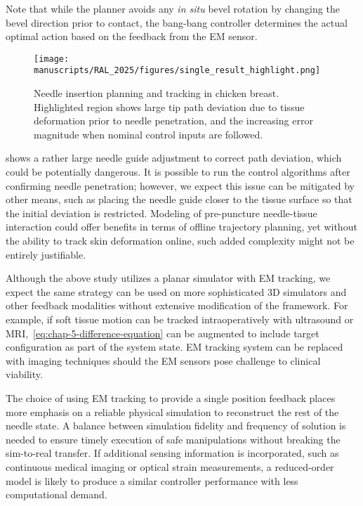 Note that while the planner avoids any \textit{in situ} bevel rotation by changing the bevel direction prior to contact, the bang-bang controller determines the actual optimal action based on the feedback from the EM sensor.

\begin{figure}[h]
  \centering
  \texttt{[image: manuscripts/RAL\_2025/figures/single\_result\_highlight.png]}
  \caption{Needle insertion planning and tracking in chicken breast. Highlighted region shows large tip path deviation due to tissue deformation prior to needle penetration, and the increasing error magnitude when nominal control inputs are followed.}
  \label{fig:chap-5-single-result}
\end{figure}


 shows a rather large needle guide adjustment to correct path deviation, which could be potentially dangerous. It is possible to run the control algorithms after confirming needle penetration; however, we expect this issue can be mitigated by other means, such as placing the needle guide closer to the tissue surface so that the initial deviation is restricted. Modeling of pre-puncture needle-tissue interaction could offer benefits in terms of offline trajectory planning, yet without the ability to track skin deformation online, such added complexity might not be entirely justifiable. 

Although the above study utilizes a planar simulator with EM tracking, we expect the same strategy can be used on more sophisticated 3D simulators and other feedback modalities without extensive modification of the framework. For example, if soft tissue motion can be tracked intraoperatively with ultrasound or MRI,~\cref{eq:chap-5-difference-equation} can be augmented to include target configuration as part of the system state. EM tracking system can be replaced with imaging techniques should the EM sensors pose challenge to clinical viability. 

The choice of using EM tracking to provide a single position feedback places more emphasis on a reliable physical simulation to reconstruct the rest of the needle state. A balance between simulation fidelity and frequency of solution is needed to ensure timely execution of safe manipulations without breaking the sim-to-real transfer. If additional sensing information is incorporated, such as continuous medical imaging or optical strain measurements, a reduced-order model is likely to produce a similar controller performance with less computational demand.

